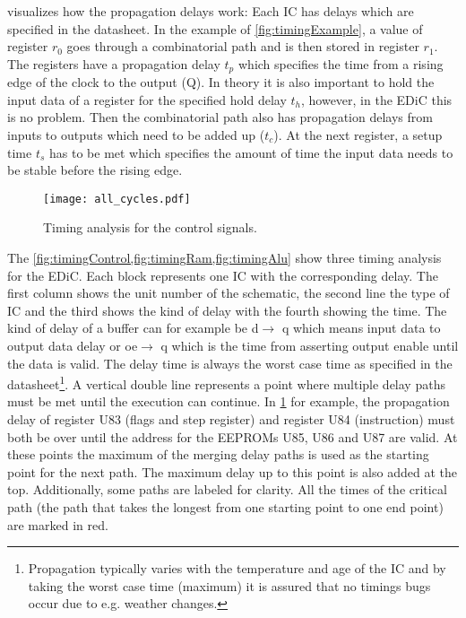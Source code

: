  visualizes how the propagation delays work:
Each \gls{IC} has delays which are specified in the datasheet.
In the example of \cref{fig:timingExample}, a value of register $r_0$ goes through a combinatorial path and is then stored in register $r_1$.
The registers have a propagation delay $t_p$ which specifies the time from a rising edge of the clock to the output (Q).
In theory it is also important to hold the input data of a register for the specified hold delay $t_h$, however, in the \gls{EDiC} this is no problem.
Then the combinatorial path also has propagation delays from inputs to outputs which need to be added up ($t_c$).
At the next register, a setup time $t_s$ has to be met which specifies the amount of time the input data needs to be stable before the rising edge.

\begin{figure}[t]
  \centering
  \texttt{[image: all\_cycles.pdf]}
  \caption{Timing analysis for the control signals.}
  \label{fig:timingControl}
\end{figure}
The \cref{fig:timingControl,fig:timingRam,fig:timingAlu} show three timing analysis for the \gls{EDiC}.
Each block represents one \gls{IC} with the corresponding delay.
The first column shows the unit number of the schematic, the second line the type of \gls{IC} and the third shows the kind of delay with the fourth showing the time.
The kind of delay of a buffer can for example be d$\rightarrow$ q which means input data to output data delay or oe$\rightarrow$ q which is the time from asserting output enable until the data is valid.
The delay time is always the worst case time as specified in the datasheet\footnote{Propagation typically varies with the temperature and age of the \gls{IC} and by taking the worst case time (maximum) it is assured that no timings bugs occur due to e.g. weather changes.}.
A vertical double line represents a point where multiple delay paths must be met until the execution can continue.
In \cref{fig:timingControl} for example, the propagation delay of register U83 (flags and step register) and register U84 (instruction) must both be over until the address for the \glspl{EEPROM} U85, U86 and U87 are valid.
At these points the maximum of the merging delay paths is used as the starting point for the next path.
The maximum delay up to this point is also added at the top.
Additionally, some paths are labeled for clarity.
All the times of the critical path (the path that takes the longest from one starting point to one end point) are marked in red.

